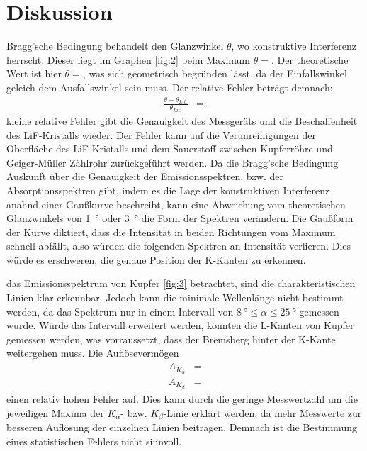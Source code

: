 \newpage
\section{Diskussion}

    \justifying Bragg'sche Bedingung behandelt den Glanzwinkel $\theta$, wo konstruktive Interferenz herrscht. Dieser liegt im
    Graphen \ref{fig:2} beim Maximum $\theta = \text{}$. Der theoretische Wert ist hier $\theta=\text{}$,
    was sich geometrisch begründen lässt, da der Einfallswinkel geleich dem Ausfallswinkel sein muss. Der relative Fehler beträgt demnach:
    \begin{align}
        \frac{\theta-\theta_{Lit.}}{\theta_{Lit.}} &= \text{.}\label{eq:29}
    \end{align}
    \justifying kleine relative Fehler gibt die Genauigkeit des Messgeräts und die Beschaffenheit des LiF-Kristalls wieder.
    Der Fehler kann auf die Verunreinigungen der Oberfläche des LiF-Kristalls und dem Sauerstoff zwischen Kupferröhre und Geiger-Müller
    Zählrohr zurückgeführt werden. Da die Bragg'sche Bedingung Auskunft über die Genauigkeit der Emissionsspektren, bzw. der Absorptionsspektren
    gibt, indem es die Lage der konstruktiven Interferenz anahnd einer Gaußkurve beschreibt, kann eine Abweichung vom theoretischen Glanzwinkels
    von \SI{1}{\degree} oder \SI{3}{\degree} die Form der Spektren verändern. Die Gaußform der Kurve diktiert, dass die Intensität in beiden 
    Richtungen vom Maximum schnell abfällt, also würden die folgenden Spektren an Intensität verlieren. Dies würde es erschweren, die genaue 
    Position der K-Kanten zu erkennen.

    \justifying das Emissionsspektrum von Kupfer \ref{fig:3} betrachtet, sind die charakteristischen Linien klar erkennbar.
    Jedoch kann die minimale Wellenlänge nicht bestimmt werden, da das Spektrum nur in einem Intervall von $\SI{8}{\degree}\leq\alpha\leq\SI{25}{\degree}$
    gemessen wurde. Würde das Intervall erweitert werden, könnten die L-Kanten von Kupfer gemessen werden, was vorraussetzt, dass der Bremsberg hinter
    der K-Kante weitergehen muss. Die Auflösevermögen
    \begin{subequations}\label{eq:30}
    \begin{align}
    A_{K_{\alpha}}  &= \text{} \label{eq:30a}\\
    A_{K_{\beta}}   &= \text{} \label{eq:30b}
    \end{align}
    \end{subequations} 
    \justifying einen relativ hohen Fehler auf. Dies kann durch die geringe Messwertzahl um die jeweiligen Maxima der $K_{\alpha}$- 
    bzw. $K_{\beta}$-Linie erklärt werden, da mehr Messwerte zur besseren Auflösung der einzelnen Linien beitragen. Demnach ist die Bestimmung
    eines statistischen Fehlers nicht sinnvoll.
    
